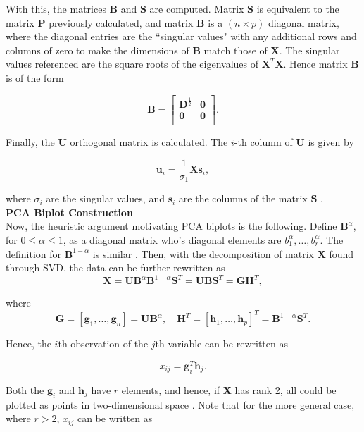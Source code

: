 \documentclass{article}\usepackage[]{graphicx}\usepackage[]{xcolor}
\numberwithin{equation}{section}
\begin{document}
\noindent With this, the matrices $\mathbf{B}$ and $\mathbf{S}$ are computed. Matrix $\mathbf{S}$ is equivalent to the matrix $\mathbf{P}$ previously calculated, and matrix $\mathbf{B}$ is a $(n \times p)$ diagonal matrix, where the diagonal entries are the ``singular values" with any additional rows and columns of zero to make the dimensions of $\mathbf{B}$ match those of $\mathbf{X}$. The singular values referenced are the square roots of the eigenvalues of $\mathbf{X}^T\mathbf{X}$. Hence matrix $\mathbf{B}$ is of the form

\[
\mathbf{B} = 
\begin{bmatrix}
    \mathbf{D}^{\frac{1}{2}} & \mathbf{0} \\
    \mathbf{0} & \mathbf{0} \\
\end{bmatrix}.
\]

\noindent Finally, the $\mathbf{U}$ orthogonal matrix is calculated. The $i$-th column of $\mathbf{U}$ is given by

\[
\mathbf{u}_i = \frac{1}{\sigma_1}\mathbf{X}\mathbf{s}_i,
\]

\noindent where $\sigma_i$ are the singular values, and $\mathbf{s}_i$ are the columns of the matrix $\mathbf{S}$ \cite{baker2005singular}.\\

\noindent \textbf{PCA Biplot Construction}\\
\noindent Now, the heuristic argument motivating PCA biplots is the following. Define $\mathbf{B}^{\alpha}$, for $0 \leq \alpha \leq 1$, as a diagonal matrix who's diagonal elements are $b_1^{\alpha}, \ldots, b_r^{\alpha}$. The definition for $\mathbf{B}^{1-\alpha}$ is similar \cite{biplotsnotes}. Then, with the decomposition of matrix $\mathbf{X}$ found through SVD, the data can be further rewritten as
\[\mathbf{X} = \mathbf{U}\mathbf{B}^{\alpha}\mathbf{B}^{1-\alpha}\mathbf{S}^{T} = \mathbf{U}\mathbf{B}\mathbf{S}^{T} = \mathbf{G}\mathbf{H}^{T},\]

\noindent where \[\mathbf{G} = [\mathbf{g}_1, \dots , \mathbf{g}_n] = \mathbf{U}\mathbf{B}^\alpha, \quad \mathbf{H}^T = [\mathbf{h}_1, \dots , \mathbf{h}_p]^T = \mathbf{B}^{1-\alpha}\mathbf{S}^T. \]

\noindent Hence, the $i$th observation of the $j$th variable can be rewritten as

\[ x_{ij} = \mathbf{g}_i^T \mathbf{h}_j. \]

\noindent Both the $\mathbf{g}_i$ and $\mathbf{h}_j$ have $r$ elements, and hence, if $\mathbf{X}$ has rank 2, all could be plotted as points in two-dimensional space \cite{biplotsnotes}. Note that for the more general case, where $r > 2$, $x_{ij}$ can be written as
\end{document}
